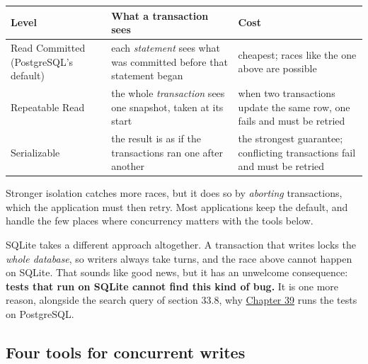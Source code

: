 {\def\LTcaptype{none} %
\begin{longtable}[]{@{}
  >{\raggedright\arraybackslash}p{}
  >{\raggedright\arraybackslash}p{}
  >{\raggedright\arraybackslash}p{}@{}}
\toprule\noalign{}
\begin{minipage}[b]{\linewidth}\raggedright
Level
\end{minipage} & \begin{minipage}[b]{\linewidth}\raggedright
What a transaction sees
\end{minipage} & \begin{minipage}[b]{\linewidth}\raggedright
Cost
\end{minipage} \\
\midrule\noalign{}
\endhead
\bottomrule\noalign{}
\endlastfoot
Read Committed (PostgreSQL's default) & each \emph{statement} sees what was committed before that statement began & cheapest; races like the one above are possible \\
Repeatable Read & the whole \emph{transaction} sees one snapshot, taken at its start & when two transactions update the same row, one fails and must be retried \\
Serializable & the result is as if the transactions ran one after another & the strongest guarantee; conflicting transactions fail and must be retried \\
\end{longtable}
}

Stronger isolation catches more races, but it does so by \emph{aborting} transactions, which the application must then retry. Most applications keep the default, and handle the few places where concurrency matters with the tools below.

SQLite takes a different approach altogether. A transaction that writes locks the \emph{whole database}, so writers always take turns, and the race above cannot happen on SQLite. That sounds like good news, but it has an unwelcome consequence: \textbf{tests that run on SQLite cannot find this kind of bug.} It is one more reason, alongside the search query of section 33.8, why \hyperref[ch:39-local-vs-production]{Chapter 39} runs the tests on PostgreSQL.

\subsection*{Four tools for concurrent writes}\label{33-logic-execution:four-tools-for-concurrent-writes}

